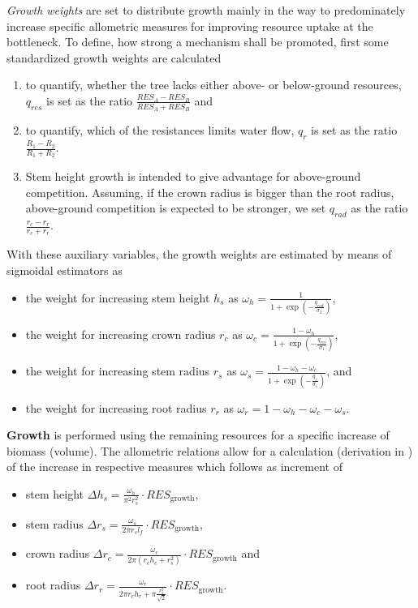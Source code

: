 \documentclass[manusscript, 12p, authoryear]{elsarticle}
\begin{document}
\textit{Growth weights}
are set to distribute growth mainly in the way to predominately increase specific allometric measures for improving resource uptake at the bottleneck.
To define, how strong a mechanism shall be promoted, first some standardized growth weights are calculated
\begin{enumerate}
\item to quantify, whether the tree lacks either above- or below-ground resources,
$q_{res}$ is set as the ratio
$\frac{RES_A - RES_B}{RES_A + RES_B}$ and 
\item to quantify, which of the resistances limits water flow, $q_r$ is set as the ratio $\frac{R_1 - R_2}{R_1 + R_2}$.
\item Stem height growth is intended to give advantage for above-ground competition.
Assuming, if the crown radius is bigger than the root radius, above-ground competition is expected to be stronger, we set $q_{rad}$ as the ratio $\frac{r_c - r_r}{r_c + r_r}$.
\end{enumerate}
With these auxiliary variables, the growth weights are estimated by means of sigmoidal estimators as
\begin{itemize}
\item the weight for increasing stem height $h_s$ as 
$\omega_h = \frac{1}{1 + \exp\left(-\frac{q_{rad}}{\sigma_2}\right)}$,
\item the weight for increasing crown radius $r_c$ as 
$\omega_c = \frac{1 - \omega_h}{1 + \exp\left(-\frac{q_{res}}{\sigma_1}\right)}$,
\item the weight for increasing stem radius $r_s$ as 
$\omega_s = \frac{1 - \omega_h-\omega_c}{1 + \exp\left(-\frac{q_r}{\sigma_1}\right)}$, and
\item the weight for increasing root radius $r_r$ as 
$\omega_r = 1 - \omega_h-\omega_c - \omega_s$.
\end{itemize}
\textbf{Growth} is performed using the remaining resources for a specific increase of biomass (volume).
The allometric relations allow for a calculation (derivation in \citet{Ronny2014}) of the increase in respective measures which follows as increment of
\begin{itemize}
\item stem height $\Delta h_s = \frac{\omega_h }{\pi^2 r_s^2}\cdot RES_{\text{growth}}$,
\item stem radius $\Delta r_s = \frac{\omega_s}{2\pi r_s l_f}\cdot RES_{\text{growth}}$,
\item crown radius $\Delta r_c = \frac{\omega_c }{2\pi \left(r_c h_c + r_s^2\right)}\cdot RES_{\text{growth}}$ and
\item root radius $\Delta r_r = \frac{\omega_r}{2 \pi r_r h_r + \pi \frac{r_s^2}{\sqrt{2}}}\cdot RES_{\text{growth}}$.
\end{itemize}
\end{document}
